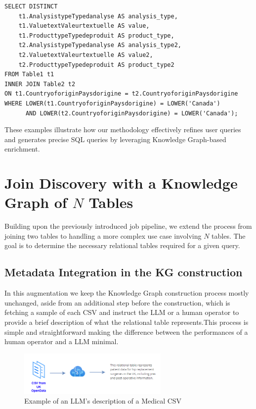 \begin{verbatim}
SELECT DISTINCT 
    t1.AnalysistypeTypedanalyse AS analysis_type, 
    t1.ValuetextValeurtextuelle AS value, 
    t1.ProducttypeTypedeproduit AS product_type, 
    t2.AnalysistypeTypedanalyse AS analysis_type2, 
    t2.ValuetextValeurtextuelle AS value2, 
    t2.ProducttypeTypedeproduit AS product_type2
FROM Table1 t1
INNER JOIN Table2 t2 
ON t1.CountryoforiginPaysdorigine = t2.CountryoforiginPaysdorigine
WHERE LOWER(t1.CountryoforiginPaysdorigine) = LOWER('Canada') 
      AND LOWER(t2.CountryoforiginPaysdorigine) = LOWER('Canada');
\end{verbatim}

These examples illustrate how our methodology effectively refines user queries and generates precise SQL queries by leveraging Knowledge Graph-based enrichment.

\section{Join Discovery with a Knowledge Graph of \( N \) Tables}

Building upon the previously introduced job pipeline, we extend the process from joining two tables to handling a more complex use case involving \( N \) tables. The goal is to determine the necessary relational tables required for a given query. 
\subsection{Metadata Integration in the KG construction}
In this augmentation we keep the Knowledge Graph construction process mostly unchanged, aside from an additional step before the construction, which is fetching a sample of each CSV and instruct the LLM or a human operator to provide a brief description of what the relational table represents.This process is simple and straightforward making the difference between the performances of a human operator and a LLM minimal.
\begin{figure}[h]
    \centering
\includegraphics[width=0.65\textwidth]{IMAGES/immagine_2025-04-05_084400623.png}
    \caption{Example of an LLM's description of a Medical CSV}
    \label{fig:LLM CSV analysis}
\end{figure}



